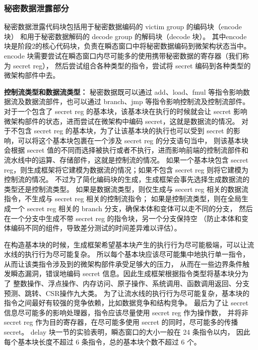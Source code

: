 \subsubsection{秘密数据泄露部分}

秘密数据泄露代码块包括用于秘密数据编码的 victim group 的编码块（encode 块）
和用于秘密数据解码的 decode group 的解码块（decode 块）。
其中encode 块是阶段2的核心代码块，负责在瞬态窗口中将秘密数据编码到微架构状态当中。
encode 块需要尝试在瞬态窗口内尽可能多的使用携带秘密数据的寄存器（我们称为 secret reg），
然后尝试组合各种类型的指令，尝试将 secret 编码到各种类型的微架构部件中去。\par

\textbf{控制流类型和数据流类型：}
秘密数据既可以通过 add、load、fmul 等指令影响数据流及数据流部件，也可以通过 branch、jmp 等指令影响控制流及控制流部件。
对于一个包含了 secret reg 的基本块，该基本块在执行的时候就会让 secret 影响微架构部件的状态，进而尝试在微架构中编码 secret，这就是数据流的情况。
对于不包含 secret reg 的基本块，为了让该基本块的执行也可以受到 secret 的影响，可以将这个基本块包裹在一个涉及 secret reg 的分支语句当中，
则该基本块会根据 secret 值的不同而选择被执行或者不执行，进而影响前端的控制流部件和流水线中的运算、存储部件，这就是控制流的情况。
如果一个基本块包含 secret reg，则生成框架将它建模为数据流的情况；如果不包含 secret reg 则将它建模为控制流的情况。
不过为了简化编码块的生成，生成框架会事先选择生成数据流的类型还是控制流类型。
如果是数据流类型，则仅生成与 secert reg 相关的数据流指令，不生成与 secret reg 相关的控制流指令；
如果是控制流类型，则在全局生成一个 secret reg 相关的 branch 分支，确保本体和变体可以走不同的分支，
然后在一个分支中生成不带 secret reg 的指令块，另一个分支保持空
（防止本体和变体编码不同的组件，导致差分测试的时间差异难以评估）。\par

在构造基本块的时候，生成框架希望基本块产生的执行行为尽可能极端，可以让流水线的执行行为尽可能复杂。
所以每个基本块应该尽可能集中地执行单一指令，从而让该类指令涉及到的微架构部件承受足够大的压力，
从而在一些边界条件触发瞬态漏洞，错误地编码 secret 信息。因此生成框架根据指令类型将基本块分为了
整数操作、浮点操作、内存访问、原子操作、系统调用、函数调用返回、分支预测、跳转、CSR操作九大类。
为了让流水线的执行行为尽可能复杂，基本块的指令之间最好有较强的竞争依赖，比如数据竞争和结构竞争。
最后为了让 secret 信息尽可能多的影响处理器，指令应该尽量使用 secret reg 作为操作数，
并将非 secret reg 作为目的寄存器，在尽可能多使用 secret 的同时，尽可能多的传播 secret。
delay 块一节的实验表明，瞬态窗口的大小一般在 24 条指令以内，
因此每个基本块长度不超过 6 条指令，总的基本块个数不超过 6 个。\par

